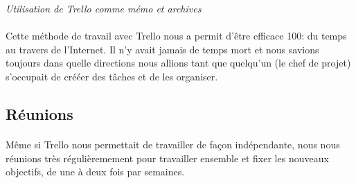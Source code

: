 \noindent
{}
\begin{center}
\textit{Utilisation de Trello comme mémo et archives }
\end{center}

\paragraph{}
Cette méthode de travail avec Trello nous a permit d’être efficace 100: du temps au travers de l’Internet. Il n’y avait jamais de temps mort et nous savions toujours dans quelle directions nous allions tant que quelqu’un (le chef de projet) s’occupait de crééer des tâches et de les organiser.


\subsection{Réunions}

\paragraph{}
Même si Trello nous permettait de travailler de façon indépendante, nous nous réunions très régulièremement pour travailler ensemble et fixer les nouveaux objectifs, de une à deux fois par semaines.


